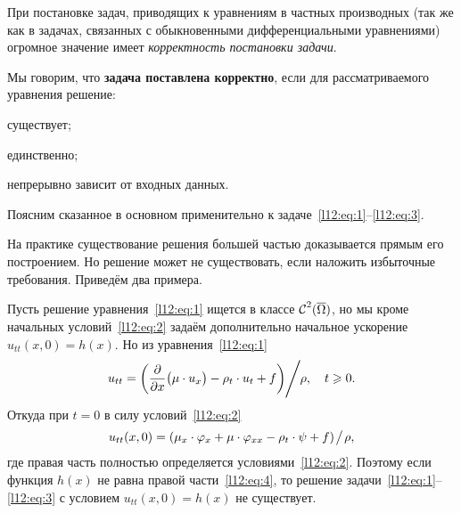 При постановке задач, приводящих к уравнениям в частных производных (так же как в задачах, связанных с обыкновенными дифференциальными уравнениями) огромное значение имеет \emph{корректность постановки задачи}.
\begin{Def}
	Мы говорим, что \textbf{задача поставлена корректно}, если для рассматриваемого уравнения решение:
	\begin{enumerateD}
		\item существует;
		\item единственно;
		\item непрерывно зависит от входных данных.
	\end{enumerateD} 
\end{Def}
\noindent Поясним сказанное в основном применительно к задаче~\eqref{l12:eq:1}--\eqref{l12:eq:3}.
\begin{enumerateD}
	\item На практике существование решения большей частью доказывается прямым его построением. Но решение может не существовать, если наложить избыточные требования. Приведём два примера.
	\begin{enumerateD}
		\item Пусть решение уравнения~\eqref{l12:eq:1} ищется в классе $\mathcal{C}{\mathstrut}^{2}_{}(\overline{\Omega})$, но мы кроме начальных условий~\eqref{l12:eq:2} задаём дополнительно начальное ускорение $u_{tt}(x,0)=h(x)$. Но из уравнения~\eqref{l12:eq:1}
		\begin{equation*}
			u_{tt}=\left(\frac{\partial}{\partial x}\big(\mu\cdot u_x\big)-\rho_t\cdot u_t+f\right)\!\!\Biggm/\!\!\rho,\quad t\geqslant0.
		\end{equation*}
		Откуда при $t=0$ в силу условий~\eqref{l12:eq:2}
		\begin{equation}
			\label{l12:eq:4}
			u_{tt}(x,0)=\left(\mu_x\cdot\phi_x+\mu\cdot\phi_{xx}-\rho_t\cdot\psi+f\right)\!\bigm/\!\rho,
		\end{equation}
		где правая часть полностью определяется условиями~\eqref{l12:eq:2}. Поэтому если функция $h(x)$ не равна правой части~\eqref{l12:eq:4}, то решение задачи~\eqref{l12:eq:1}--\eqref{l12:eq:3} с условием $u_{tt}(x,0)=h(x)$ не существует.
		

\end{enumerateD}
\end{enumerateD}
